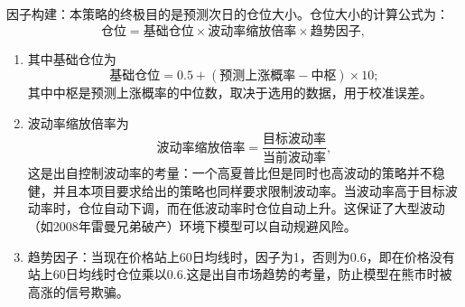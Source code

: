 \documentclass[11pt, a4paper]{article}
\begin{document}
\begin{enumerate}
    因子构建：本策略的终极目的是预测次日的仓位大小。仓位大小的计算公式为：$$\text{仓位}=\text{基础仓位}\times\text{波动率缩放倍率}\times\text{趋势因子},$$
    \begin{enumerate}
        \item 其中基础仓位为$$\text{基础仓位} = 0.5 + (\text{预测上涨概率} - \text{中枢}) \times 10;$$其中中枢是预测上涨概率的中位数，取决于选用的数据，用于校准误差。
        \item 波动率缩放倍率为$$\text{波动率缩放倍率} = \frac{\text{目标波动率}}{\text{当前波动率}},$$这是出自控制波动率的考量：一个高夏普比但是同时也高波动的策略并不稳健，并且本项目要求给出的策略也同样要求限制波动率。当波动率高于目标波动率时，仓位自动下调，而在低波动率时仓位自动上升。这保证了大型波动（如2008年雷曼兄弟破产）环境下模型可以自动规避风险。
        \item 趋势因子：当现在价格站上60日均线时，因子为1，否则为0.6，即在价格没有站上60日均线时仓位乘以0.6.这是出自市场趋势的考量，防止模型在熊市时被高涨的信号欺骗。
    \end{enumerate}
\end{enumerate}
\end{document}
